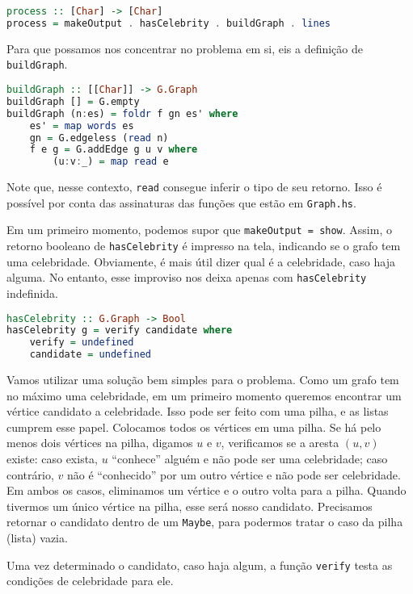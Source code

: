 \documentclass[a4paper]{article}
\begin{document}
\begin{lstlisting}[language=haskell, frame=single]
process :: [Char] -> [Char]
process = makeOutput . hasCelebrity . buildGraph . lines
\end{lstlisting}

Para que possamos nos concentrar no problema em si, eis a definição de \texttt{buildGraph}.

\begin{lstlisting}[language=haskell, frame=single]
buildGraph :: [[Char]] -> G.Graph
buildGraph [] = G.empty
buildGraph (n:es) = foldr f gn es' where
	es' = map words es
	gn = G.edgeless (read n)
	f e g = G.addEdge g u v where
		(u:v:_) = map read e
\end{lstlisting}

Note que, nesse contexto, \texttt{read} consegue inferir o tipo de seu retorno.
Isso é possível por conta das assinaturas das funções que estão em \texttt{Graph.hs}.

Em um primeiro momento, podemos supor que \texttt{makeOutput = show}. Assim, o retorno booleano de \texttt{hasCelebrity} é impresso na tela, indicando se o grafo tem uma celebridade.
Obviamente, é mais útil dizer qual é a celebridade, caso haja alguma.
No entanto, esse improviso nos deixa apenas com \texttt{hasCelebrity} indefinida.

\begin{lstlisting}[language=haskell, frame=single]
hasCelebrity :: G.Graph -> Bool
hasCelebrity g = verify candidate where
	verify = undefined
	candidate = undefined
\end{lstlisting}

Vamos utilizar uma solução bem simples para o problema.
Como um grafo tem no máximo uma celebridade, em um primeiro momento queremos encontrar um vértice candidato a celebridade.
Isso pode ser feito com uma pilha, e as listas cumprem esse papel.
Colocamos todos os vértices em uma pilha.
Se há pelo menos dois vértices na pilha, digamos $u$ e $v$, verificamos se a aresta $(u, v)$ existe:
caso exista, $u$ ``conhece'' alguém e não pode ser uma celebridade;
caso contrário, $v$ não é ``conhecido'' por um outro vértice e não pode ser celebridade.
Em ambos os casos, eliminamos um vértice e o outro volta para a pilha.
Quando tivermos um único vértice na pilha, esse será nosso candidato.
Precisamos retornar o candidato dentro de um \texttt{Maybe}, para podermos tratar o caso da pilha (lista) vazia.

Uma vez determinado o candidato, caso haja algum, a função \texttt{verify} testa as condições de celebridade para ele.
\end{document}
